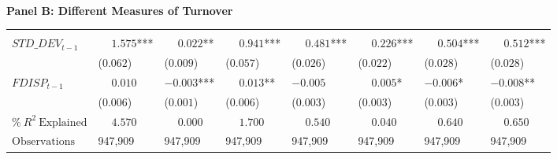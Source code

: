 \begin{landscape}
\begin{table}
\begin{threeparttable}
\phantom{ }\\
\textbf{Panel B: Different Measures of Turnover}
\begin{tabular}[t]{>{\raggedright\arraybackslash}p{4.1cm}>{\raggedright\arraybackslash}p{2.1cm}>{\raggedright\arraybackslash}p{2.1cm}>{\raggedright\arraybackslash}p{2.1cm}>{\raggedright\arraybackslash}p{2.1cm}>{\raggedright\arraybackslash}p{2.1cm}>{\raggedright\arraybackslash}p{2.1cm}>{\raggedright\arraybackslash}p{2.1cm}}
\toprule
\multicolumn{1}{c}{ } & \multicolumn{1}{c}{$L\_TURN_t$} & \multicolumn{1}{c}{$\Delta L\_TURN_t$} & \multicolumn{1}{c}{$L\_TURN\_GRT_t$} & \multicolumn{1}{c}{$L\_TURN\_D_t$} & \multicolumn{1}{c}{$L\_TURN\_ILLIQ_t$} & \multicolumn{1}{c}{$VW\_L\_TURN_t$} & \multicolumn{1}{c}{$EW\_L\_TURN_t$} \\
\cmidrule(l{3pt}r{3pt}){2-2} \cmidrule(l{3pt}r{3pt}){3-3} \cmidrule(l{3pt}r{3pt}){4-4} \cmidrule(l{3pt}r{3pt}){5-5} \cmidrule(l{3pt}r{3pt}){6-6} \cmidrule(l{3pt}r{3pt}){7-7} \cmidrule(l{3pt}r{3pt}){8-8}
$STD\_DEV_{t-1}$ & $\phantom{-}1.575$*** & $\phantom{-}0.022$** & $\phantom{-}0.941$*** & $\phantom{-}0.481$*** & $\phantom{-}0.226$*** & $\phantom{-}0.504$*** & $\phantom{-}0.512$***\\
 & (\phantom{-}$0.062$) & (\phantom{-}$0.009$) & (\phantom{-}$0.057$) & (\phantom{-}$0.026$) & (\phantom{-}$0.022$) & (\phantom{-}$0.028$) & (\phantom{-}$0.028$)\\
\addlinespace
$FDISP_{t-1}$ & $\phantom{-}0.010$ & $-0.003$*** & $\phantom{-}0.013$** & $-0.005$ & $\phantom{-}0.005$* & $-0.006$* & $-0.008$**\\
 & (\phantom{-}$0.006$) & (\phantom{-}$0.001$) & (\phantom{-}$0.006$) & (\phantom{-}$0.003$) & (\phantom{-}$0.003$) & (\phantom{-}$0.003$) & (\phantom{-}$0.003$)\\
\midrule
$\% \: R^2 \: \textrm{Explained}$ & {$\phantom{-}4.570$} & {$\phantom{-}0.000$} & {$\phantom{-}1.700$} & {$\phantom{-}0.540$} & {$\phantom{-}0.040$} & {$\phantom{-}0.640$} & {$\phantom{-}0.650$}\\
$\textrm{Observations}$ & {\phantom{-}947,909} & {\phantom{-}947,909} & {\phantom{-}947,909} & {\phantom{-}947,909} & {\phantom{-}947,909} & {\phantom{-}947,909} & {\phantom{-}947,909}\\
\bottomrule
\end{tabular}
\begin{tablenotes}
\item 
\end{tablenotes}
\end{threeparttable}





\end{table}
\end{landscape}
